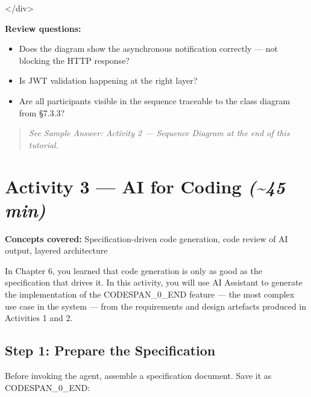\documentclass[11pt,a4paper]{book}
\begin{document}
</div>

\textbf{Review questions:}
\begin{itemize}
  \item Does the diagram show the asynchronous notification correctly --- not blocking the HTTP response?
  \item Is JWT validation happening at the right layer?
  \item Are all participants visible in the sequence traceable to the class diagram from §7.3.3?
\end{itemize}

\begin{quote}
\textit{See Sample Answer: Activity 2 --- Sequence Diagram at the end of this tutorial.}
\end{quote}

\medskip

\section{Activity 3 --- AI for Coding \textit{(\textasciitilde{}45 min)}}

\textbf{Concepts covered:} Specification-driven code generation, code review of AI output, layered architecture

In Chapter 6, you learned that code generation is only as good as the specification that drives it. In this activity, you will use AI Assistant to generate the implementation of the CODESPAN\_0\_END feature --- the most complex use case in the system --- from the requirements and design artefacts produced in Activities 1 and 2.

\subsection{Step 1: Prepare the Specification}

Before invoking the agent, assemble a specification document. Save it as CODESPAN\_0\_END:
\end{document}
